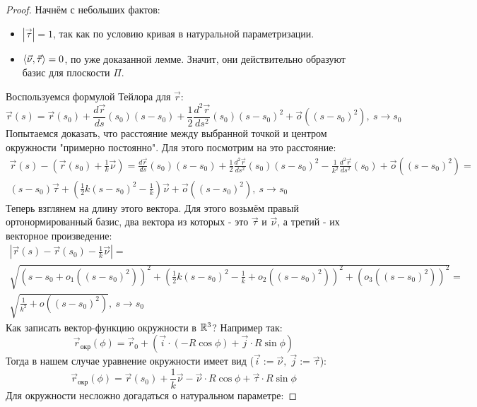 \begin{proof}
	Начнём с небольших фактов:
	\begin{itemize}
		\item $|\vec{\tau}| = 1$, так как по условию кривая в натуральной параметризации.
		
		\item $\left\langle\vec{\nu}, \vec{\tau}\right\rangle = 0$, по уже доказанной лемме. Значит, они действительно образуют базис для плоскости $\Pi$.
	\end{itemize}
	Воспользуемся формулой Тейлора для $\vec{r}$:
	\[
		\vec{r}(s) = \vec{r}(s_0) + \frac{d\vec{r}}{ds}(s_0)(s - s_0) + \frac{1}{2}\frac{d^2\vec{r}}{ds^2}(s_0)(s - s_0)^2 + \vec{o}\left((s - s_0)^2\right),\ s \to s_0
	\]
	Попытаемся доказать, что расстояние между выбранной точкой и центром окружности "примерно постоянно". Для этого посмотрим на это расстояние:
	\begin{multline*}
		\vec{r}(s) - \left(\vec{r}(s_0) + \frac{1}{k}\vec{\nu}\right) = \frac{d\vec{r}}{ds}(s_0)(s - s_0) + \frac{1}{2} \frac{d^2 \vec{r}}{ds^2}(s_0)(s - s_0)^2 - \frac{1}{k^2}\frac{d^2\vec{r}}{ds^2}(s_0) + \vec{o}\left((s - s_0)^2\right) =
		\\
		(s - s_0)\vec{\tau} + \left(\frac{1}{2}k(s - s_0)^2 - \frac{1}{k}\right)\vec{\nu} + \vec{o}\left((s - s_0)^2\right),\ s \to s_0
	\end{multline*}
	Теперь взглянем на длину этого вектора. Для этого возьмём правый ортонормированный базис, два вектора из которых - это $\vec{\tau}$ и $\vec{\nu}$, а третий - их векторное произведение:
	\begin{multline*}
		\left|\vec{r}(s) - \vec{r}(s_0) - \frac{1}{k}\vec{\nu}\right| =
		\\
		\sqrt{\left(s - s_0 + o_1\left((s - s_0)^2\right)\right)^2 + \left(\frac{1}{2}k(s - s_0)^2 - \frac{1}{k} + o_2\left((s - s_0)^2\right)\right)^2 + \left(o_3\left((s - s_0)^2\right)\right)^2} =
		\\
		\sqrt{\frac{1}{k^2} + o\left((s - s_0)^2\right)},\ s \to s_0
	\end{multline*}
	Как записать вектор-функцию окружности в $\mathbb{R}^3$? Например так:
	\[
		\vec{r}_{\text{окр}}(\phi) = \vec{r}_0 + (\vec{i} \cdot (-R\cos \phi) + \vec{j} \cdot R \sin \phi)
	\]
	Тогда в нашем случае уравнение окружности имеет вид ($\vec{i} := \vec{\nu},\ \vec{j} := \vec{\tau}$):
	\[
		\vec{r}_\text{окр}(\phi) = \vec{r}(s_0) + \frac{1}{k}\vec{\nu} - \vec{\nu} \cdot R\cos \phi + \vec{\tau} \cdot R \sin \phi
	\]
	Для окружности несложно догадаться о натуральном параметре:

\end{proof}
